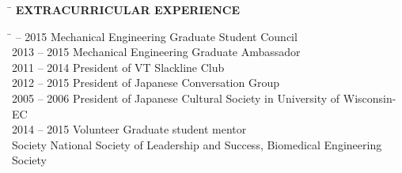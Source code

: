 \documentclass[11pt,letter]{article}
\begin{document}
\begin{tabbing}
	\hspace{2cm}\=\kill
	\>  {\bf \Large EXTRACURRICULAR EXPERIENCE}
\end{tabbing}
\begin{tabbing}
	\hspace{3cm} \=  -- 2015 \> Mechanical Engineering Graduate Student Council\\
	2013 -- 2015 \> Mechanical Engineering Graduate Ambassador\\
	2011 -- 2014 \> President of VT Slackline Club\\
	2012 -- 2015 \>	 President of Japanese Conversation Group\\
	2005 -- 2006\>	 President of Japanese Cultural Society in University of Wisconsin-EC\\
	2014 -- 2015 \> Volunteer  Graduate student mentor\\
	\> Society National Society of Leadership and Success, Biomedical Engineering Society
\end{tabbing}

\end{document}
